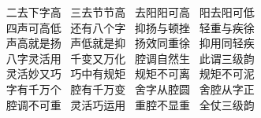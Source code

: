 {\hspace*{50pt}~ 二去下字高~\hspace{40pt} 三去节节高~\hspace{40pt} 去阳阳可高~\hspace{40pt} 阳去阳可低\\
\hspace*{50pt}~ 四声可高低~\hspace{40pt} 还有八个字~\hspace{40pt} 抑扬与顿挫~\hspace{40pt} 轻重与疾徐\\
\hspace*{50pt}~ 声高就是扬~\hspace{40pt} 声低就是抑~\hspace{40pt} 扬效同重徐~\hspace{40pt} 抑用同轻疾\\
\hspace*{50pt}~ 八字灵活用~\hspace{40pt} 千变又万化~\hspace{40pt} 腔调自然生~\hspace{40pt} 此谓三级韵\\
\hspace*{50pt}~ 灵活妙又巧~\hspace{40pt} 巧中有规矩~\hspace{40pt} 规矩不可离~\hspace{40pt} 规矩不可泥\\
\hspace*{50pt}~ 字有千万个~\hspace{40pt} 腔有千万变~\hspace{40pt} 舍字从腔圆~\hspace{40pt} 舍腔从字正\\
\hspace*{50pt}~ 腔调不可重~\hspace{40pt} 灵活巧运用~\hspace{40pt} 重腔不显重~\hspace{40pt} 全仗三级韵}
